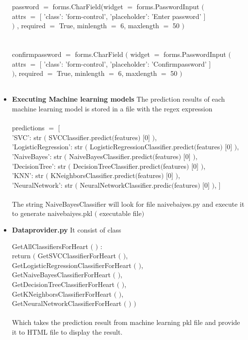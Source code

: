 \documentclass[oneside,12pt]{Classes/VTU}
\begin{document}
\begin{itemize}
		password $=$ forms.CharField(widget $=$ forms.PasswordInput $($  \\
		attrs $=$ $[$ 'class': 'form-control', 'placeholder': 'Enter password' $]$  \\
		$)$ , required $=$ True, minlength $=$ 6, maxlength $=$ 50 $)$  \\
		\\
		\\
		confirmpassword $=$ forms.CharField $($ widget $=$ forms.PasswordInput $($  \\
		attrs $=$ $[$ 'class': 'form-control', 'placeholder': 'Confirmpassword' $]$  \\
		$)$, required $=$ True, minlength $=$ 6, maxlength $=$ 50 $)$  \\
		\\
		\item \textbf{Executing Machine learning models} The prediction results of each machine learning model is stored in a file with the regex expression\\
		\\
		predictions $=$ $[$ \\
		'SVC': str $($ SVCClassifier.predict$($features$)$ $[$0$]$ $)$, \\
		'LogisticRegression': str $($ LogisticRegressionClassifier.predict$($features$)$ $[$0$]$ $)$, \\
		'NaiveBayes': str $($ NaiveBayesClassifier.predict$($features$)$ $[$0$]$ $)$, \\
		'DecisionTree': str $($ DecisionTreeClassifier.predict$($features$)$ $[$0$]$ $)$, \\
		'KNN': str $($ KNeighborsClassifier.predict$($features$)$ $[$0$]$ $)$, \\
		'NeuralNetwork': str $($ NeuralNetworkClassifier.predic$($features$)$ $[$0$]$ $)$, $]$ \\
		\\
		The string NaiveBayesClassifier will look for file naivebaiyes.py and execute it to generate naivebaiyes.pkl $($ executable file$)$
		
		\item \textbf{Dataprovider.py} It consist of class 
		
		GetAllClassifiersForHeart $($ $)$ : \\
		return $($ GetSVCClassifierForHeart $($ $)$, \\
		GetLogisticRegressionClassifierForHeart $($ $)$, \\
		GetNaiveBayesClassifierForHeart $($ $)$, \\
		GetDecisionTreeClassifierForHeart $($ $)$, \\
		GetKNeighborsClassifierForHeart $($ $)$, \\
		GetNeuralNetworkClassifierForHeart $($ $)$ $)$ \\
		\\
		Which takes the prediction result from machine learning pkl file and provide it to HTML file to display the result.
	\end{itemize}
	
\end{document}
